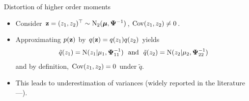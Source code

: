 \begin{frame}{Distortion of higher order moments}
  \vspace{-11pt}
  \begin{figure}[t]
    \centering\hspace{-16pt}
  \end{figure}
  \vspace{-10pt}
  \begin{itemize}[<+->]
    \item Consider ${\mathbf z} = (z_{1}, z_{2})^\top \sim \operatorname{N}_2( {\bm\mu}, {\bm\Psi}^{-1})$, $\operatorname{Cov}(z_1,z_2) \neq 0$.
    \item Approximating $p({\mathbf z})$ by $q({\mathbf z}) = q(z_1)q(z_2)$ yields
    \[
      \tilde q(z_1) = \N(z_1|\mu_1,\bPsi_{11}^{-1}) \ \text{ and } \ \tilde q(z_2) = \N(z_2|\mu_2,\bPsi_{22}^{-1})
    \]
    and by definition, $\operatorname{Cov}(z_1,z_2) = 0$ under $\tilde q$.
    \item This leads to underestimation of variances (widely reported in the literature---\cite{zhao2013}).
  \end{itemize}
\end{frame}

